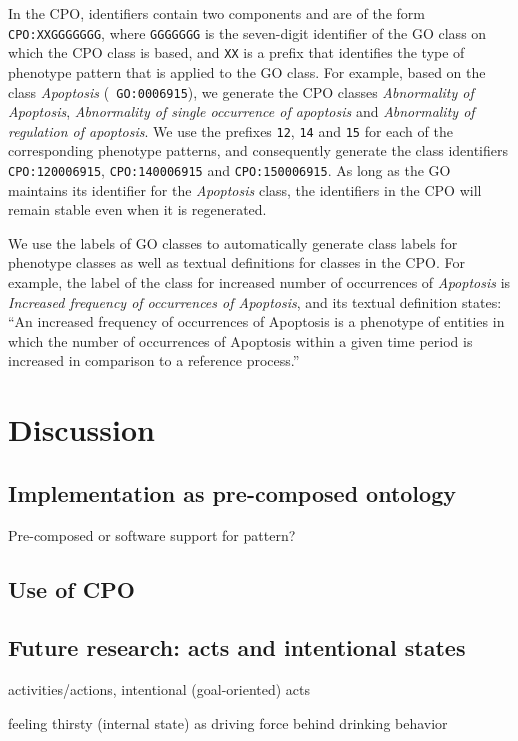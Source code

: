 \documentclass{bioinfo}
\begin{document}
In the CPO, identifiers contain two components and are of the form
{\tt CPO:XXGGGGGGG}, where {\tt GGGGGGG} is the seven-digit identifier
of the GO class on which the CPO class is based, and {\tt XX} is a
prefix that identifies the type of phenotype pattern that is applied
to the GO class. For example, based on the class {\em Apoptosis} ({\tt
  GO:0006915}), we generate the CPO classes {\em Abnormality of
  Apoptosis}, {\em Abnormality of single occurrence of apoptosis} and
{\em Abnormality of regulation of apoptosis}.  We use the prefixes
{\tt 12}, {\tt 14} and {\tt 15} for each of the corresponding
phenotype patterns, and consequently generate the class identifiers
{\tt CPO:120006915}, {\tt CPO:140006915} and {\tt CPO:150006915}. As
long as the GO maintains its identifier for the {\em Apoptosis} class,
the identifiers in the CPO will remain stable even when it is
regenerated.

We use the labels of GO classes to automatically generate class labels
for phenotype classes as well as textual definitions for classes in
the CPO. For example, the label of the class for increased number of
occurrences of {\em Apoptosis} is {\em Increased frequency of
  occurrences of Apoptosis}, and its textual definition states:
``An increased frequency of occurrences of Apoptosis is a phenotype of
entities in which the number of occurrences of Apoptosis within a
given time period is increased in comparison to a reference
process.''

\section{Discussion}
\subsection{Implementation as pre-composed ontology}
Pre-composed or software support for pattern?

\subsection{Use of CPO}

\subsection{Future research: acts and intentional states}
activities/actions, intentional (goal-oriented) acts

feeling thirsty (internal state) as driving force behind drinking
behavior
\end{document}
